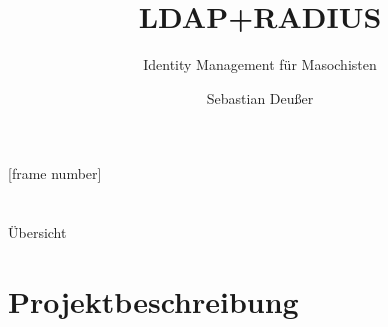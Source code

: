 \documentclass[handout,svgnames]{beamer}
\title[OpenLDAP- und FreeRADIUS-Server]   %
{LDAP+RADIUS}
\subtitle
{Identity Management für Masochisten} %
\author %
{Sebastian Deußer}
\begin{document}
\setcounter{framenumber}{-1}
\frame{\titlepage}
[frame number] %

\section{}
\begin{frame}{Übersicht}
\tableofcontents
\end{frame}
\note{}

\section{Projektbeschreibung}
\end{document}
